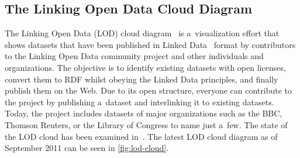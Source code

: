 \subsection{The Linking Open Data Cloud Diagram}
\label{sec:lodcloud}

The Linking Open Data (LOD) cloud
diagram~\cite{cyganiak2011lodcloud} is a~visualization effort
that shows datasets that have been published in
Linked Data~\cite{bernerslee2006linkeddata}
format by contributors to the Linking Open Data community project
and other individuals and organizations.
The objective is to identify existing datasets with open licenses,
convert them to RDF whilst obeying the Linked Data principles,
and finally publish them on the Web.
Due to its open structure, everyone can contribute to the project by publishing a~dataset and
interlinking it to existing datasets.
Today, the project includes datasets of major organizations
such as the BBC, Thomson Reuters, or the Library of Congress
to name just a~few.
The state of the LOD cloud has been examined
in~\cite{bizer2011statelodcloud}.
The latest LOD cloud diagram as of September 2011 can be seen in \autoref{fig:lod-cloud}.

